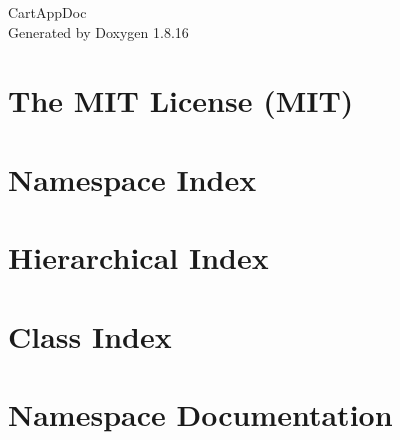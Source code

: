 \let\mypdfximage\pdfximage\def\pdfximage{\immediate\mypdfximage}\documentclass[twoside]{book}
\newcommand{\+}{\discretionary{\mbox{\scriptsize$\hookleftarrow$}}{}{}}
\newcommand{\clearemptydoublepage}{%
  \newpage{\pagestyle{empty}\cleardoublepage}%
}
\begin{document}
\hypersetup{pageanchor=false,
             bookmarksnumbered=true,
             pdfencoding=unicode
            }
\begin{titlepage}
\vspace*{7cm}
\begin{center}%
{\Large Cart\+App\+Doc }\\
\vspace*{1cm}
{\large Generated by Doxygen 1.8.16}\\
\end{center}
\end{titlepage}
\clearemptydoublepage
{}
\tableofcontents
\clearemptydoublepage
{}
\hypersetup{pageanchor=true}

\chapter{The M\+IT License (M\+IT)}
\label{md__c_1__users__b_xC5_x82a_xC5_xBCej__source__repos__cart_application__cart_app__cart_app_wwwroocd3f3fcfaf6bb41f42a65cd1500ba4c5}

\chapter{Namespace Index}

\chapter{Hierarchical Index}

\chapter{Class Index}

\chapter{Namespace Documentation}





\end{document}
